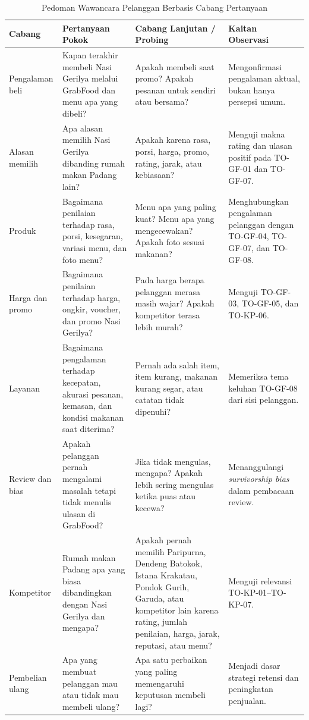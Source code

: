 \begin{table}[!htbp]
    \centering
    \caption{Pedoman Wawancara Pelanggan Berbasis Cabang Pertanyaan}
    \label{tab:pedoman-wawancara-pelanggan}
    \scriptsize
    \setlength{\tabcolsep}{3pt}
    \renewcommand{\arraystretch}{0.92}
    \begin{tabularx}{\textwidth}{|Z{2.2cm}|Y|Y|Y|}
        \toprule
        \textbf{Cabang} & \textbf{Pertanyaan Pokok} & \textbf{Cabang Lanjutan / Probing} & \textbf{Kaitan Observasi} \\ \hline
        \midrule
        Pengalaman beli & Kapan terakhir membeli Nasi Gerilya melalui GrabFood dan menu apa yang dibeli? & Apakah membeli saat promo? Apakah pesanan untuk sendiri atau bersama? & Mengonfirmasi pengalaman aktual, bukan hanya persepsi umum. \\ \hline
        Alasan memilih & Apa alasan memilih Nasi Gerilya dibanding rumah makan Padang lain? & Apakah karena rasa, porsi, harga, promo, rating, jarak, atau kebiasaan? & Menguji makna rating dan ulasan positif pada TO-GF-01 dan TO-GF-07. \\ \hline
        Produk & Bagaimana penilaian terhadap rasa, porsi, kesegaran, variasi menu, dan foto menu? & Menu apa yang paling kuat? Menu apa yang mengecewakan? Apakah foto sesuai makanan? & Menghubungkan pengalaman pelanggan dengan TO-GF-04, TO-GF-07, dan TO-GF-08. \\ \hline
        Harga dan promo & Bagaimana penilaian terhadap harga, ongkir, voucher, dan promo Nasi Gerilya? & Pada harga berapa pelanggan merasa masih wajar? Apakah kompetitor terasa lebih murah? & Menguji TO-GF-03, TO-GF-05, dan TO-KP-06. \\ \hline
        Layanan & Bagaimana pengalaman terhadap kecepatan, akurasi pesanan, kemasan, dan kondisi makanan saat diterima? & Pernah ada salah item, item kurang, makanan kurang segar, atau catatan tidak dipenuhi? & Memeriksa tema keluhan TO-GF-08 dari sisi pelanggan. \\ \hline
        Review dan bias & Apakah pelanggan pernah mengalami masalah tetapi tidak menulis ulasan di GrabFood? & Jika tidak mengulas, mengapa? Apakah lebih sering mengulas ketika puas atau kecewa? & Menanggulangi \textit{survivorship bias} dalam pembacaan review. \\ \hline
        Kompetitor & Rumah makan Padang apa yang biasa dibandingkan dengan Nasi Gerilya dan mengapa? & Apakah pernah memilih Paripurna, Dendeng Batokok, Istana Krakatau, Pondok Gurih, Garuda, atau kompetitor lain karena rating, jumlah penilaian, harga, jarak, reputasi, atau menu? & Menguji relevansi TO-KP-01--TO-KP-07. \\ \hline
        Pembelian ulang & Apa yang membuat pelanggan mau atau tidak mau membeli ulang? & Apa satu perbaikan yang paling memengaruhi keputusan membeli lagi? & Menjadi dasar strategi retensi dan peningkatan penjualan. \\ \hline
        \bottomrule
    \end{tabularx}
\end{table}

